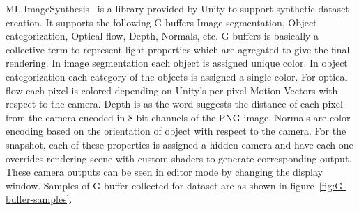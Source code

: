 ML-ImageSynthesis~\cite{imagesynthesis} is a library provided by Unity to support synthetic dataset creation.
It supports the following G-buffers Image segmentation, Object categorization, Optical flow, Depth, Normals, etc.
G-buffers is basically a collective term to represent light-properties which are agregated to give the final rendering.
In image segmentation each object is assigned unique color.
In object categorization each category of the objects is assigned a single color.
For optical flow each pixel is colored depending on Unity's per-pixel Motion Vectors with respect to the camera.
Depth is as the word suggests the distance of each pixel from the camera encoded in 8-bit channels of the PNG image.
Normals are color encoding based on the orientation of object with respect to the camera.
For the snapshot, each of these properties is assigned a hidden camera and have each one overrides rendering scene with custom shaders to generate corresponding output.
These camera outputs can be seen in editor mode by changing the display window.
Samples of G-buffer collected for dataset are as shown in figure~\ref{fig:G-buffer-samples}.

